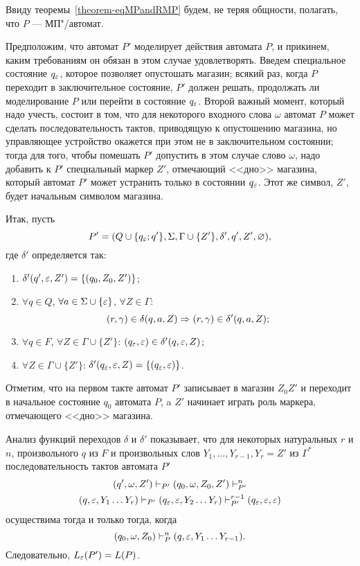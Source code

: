 \begin{myproof}
Ввиду теоремы~\ref{theorem-eqMPandRMP} будем, не теряя общности, полагать, что $P$ --- МП"/автомат.

Предположим, что автомат $P'$ моделирует действия автомата $P$, и прикинем, каким требованиям он обязан в этом случае удовлетворять. Введем специальное состояние $q_\varepsilon$, которое позволяет опустошать магазин; всякий раз, когда $P$ переходит в заключительное состояние, $P'$ должен решать, продолжать ли моделирование $P$ или перейти в состояние $q_\varepsilon$. Второй важный момент, который надо учесть, состоит в том, что для некоторого входного слова $\omega$ автомат $P$ может сделать последовательность тактов, приводящую к опустошению магазина, но управляющее устройство окажется при этом не в заключительном состоянии; тогда для того, чтобы помешать $P'$ допустить в этом случае слово $\omega$, надо добавить к $P'$ специальный маркер $Z'$, отмечающий <<дно>> магазина, который автомат $P'$ может устранить только в состоянии $q_\varepsilon$. Этот же символ, $Z'$, будет начальным символом магазина.

Итак, пусть
\[
P' = (Q\cup\{q_\varepsilon;q'\},\Sigma,\Gamma\cup\{Z'\},\delta',q',Z',\varnothing),
\]
где $\delta'$ определяется так:
\begin{enumerate}
    \item $\delta'(q',\varepsilon,Z')=\{(q_0,Z_0,Z')\}$;

    \item $\forall q\in Q$, $\forall a\in\Sigma\cup\{\varepsilon\}$,
    $\forall Z\in\Gamma$:
        \[(r,\gamma)\in\delta(q,a,Z) \Rightarrow (r,\gamma)\in\delta'(q,a,Z);\]

    \item $\forall q\in F$, $\forall Z\in\Gamma\cup\{Z'\}$:
        $(q_\varepsilon,\varepsilon)\in\delta'(q,\varepsilon,Z)$;

    \item $\forall Z\in\Gamma\cup\{Z'\}$:
        $\delta'(q_\varepsilon,\varepsilon,Z)=\{(q_\varepsilon,\varepsilon)\}$.
\end{enumerate}

Отметим, что на первом такте автомат $P'$ записывает в магазин $Z_0Z'$ и переходит в начальное состояние $q_0$ автомата $P$, a $Z'$ начинает играть роль маркера, отмечающего <<дно>> магазина.

Анализ функций переходов $\delta$ и $\delta'$ показывает, что для некоторых натуральных $r$ и $n$, произвольного $q$ из $F$ и произвольных слов $Y_1, \ldots , Y_{r-1}, Y_r=Z'$ из $\Gamma^*$ последовательность тактов автомата $P'$
\begin{multline*}
    (q',\omega,Z')
        \vdash_{P'} (q_0,\omega,Z_0,Z')
        \vdash_{P'}^n \\ (q,\varepsilon,Y_1 \ldots Y_r)
        \vdash_{P'} (q_\varepsilon,\varepsilon,Y_2 \ldots Y_r)
        \vdash_{P'}^{r-1} (q_\varepsilon,\varepsilon,\varepsilon)
\end{multline*}
осуществима тогда и только тогда, когда
\[
    (q_0,\omega,Z_0) \vdash_P^n (q, \varepsilon, Y_1 \ldots Y_{r-1}).
\]
Следовательно, $L_\varepsilon(P')=L(P)$.
\end{myproof}

